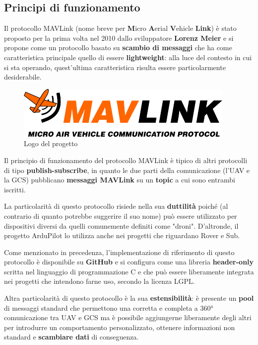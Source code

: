 \documentclass[a4paper, 12pt, oneside]{article}
\theoremstyle{definition}
\begin{document}
\subsection{Principi di funzionamento}
Il protocollo MAVLink (nome breve per \textbf{M}icro \textbf{A}erial \textbf{V}ehicle \textbf{Link}) è stato proposto per la prima volta nel 2010 dallo sviluppatore \textbf{Lorenz Meier} \cite{mavlink-first-commit} e si propone come un protocollo basato su \textbf{scambio di messaggi} che ha come caratteristica principale quello di essere \textbf{lightweight}: alla luce del contesto in cui si sta operando, quest'ultima caratteristica risulta essere particolarmente desiderabile.

\begin{figure}
    \includegraphics[width=0.9\linewidth]{images/logo_mavlink_small.png}
    \caption{Logo del progetto} 
\end{figure}

Il principio di funzionamento del protocollo MAVLink è tipico di altri protocolli di tipo \textbf{publish-subscribe}, in quanto le due parti della comunicazione (l'UAV e la GCS) pubblicano \textbf{messaggi MAVLink} su un \textbf{topic} a cui sono entrambi iscritti. 

La particolarità di questo protocollo risiede nella sua \textbf{duttilità} poiché (al contrario di quanto potrebbe suggerire il suo nome) può essere utilizzato per dispositivi diversi da quelli comunemente definiti come "droni". D'altronde, il progetto ArduPilot lo utilizza anche nei progetti che riguardano Rover e Sub.

Come menzionato in precedenza, l'implementazione di riferimento di questo protocollo è disponibile su \textbf{GitHub} e si configura come una libreria \textbf{header-only} scritta nel linguaggio di programmazione C e che può essere liberamente integrata nei progetti che intendono farne uso, secondo la licenza LGPL. \cite{mavlink-c-implementation}

Altra particolarità di questo protocollo è la sua \textbf{estensibilità}: è presente un \textbf{pool} di messaggi standard che permettono una corretta e completa a 360° comunicazione tra UAV e GCS ma è possibile aggiungerne liberamente degli altri per introdurre un comportamento personalizzato, ottenere informazioni non standard e \textbf{scambiare dati} di conseguenza. 
\end{document}
